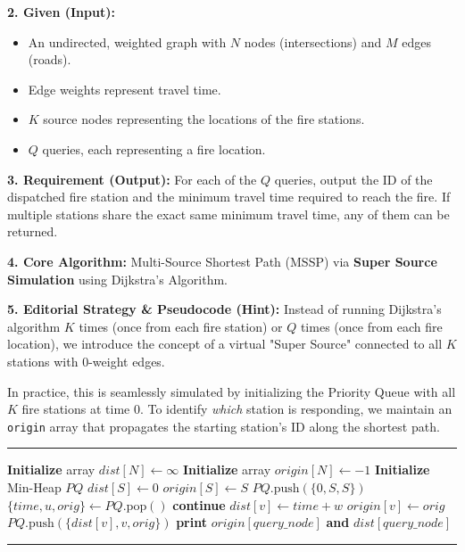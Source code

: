 \textbf{2. Given (Input):}
\begin{itemize}
    \item An undirected, weighted graph with $N$ nodes (intersections) and $M$ edges (roads).
    \item Edge weights represent travel time.
    \item $K$ source nodes representing the locations of the fire stations.
    \item $Q$ queries, each representing a fire location.
\end{itemize}

\textbf{3. Requirement (Output):}
For each of the $Q$ queries, output the ID of the dispatched fire station and the minimum travel time required to reach the fire. If multiple stations share the exact same minimum travel time, any of them can be returned.

\textbf{4. Core Algorithm:} 
Multi-Source Shortest Path (MSSP) via \textbf{Super Source Simulation} using Dijkstra's Algorithm.

\textbf{5. Editorial Strategy \& Pseudocode (Hint):}
Instead of running Dijkstra's algorithm $K$ times (once from each fire station) or $Q$ times (once from each fire location), we introduce the concept of a virtual "Super Source" connected to all $K$ stations with $0$-weight edges. 

In practice, this is seamlessly simulated by initializing the Priority Queue with all $K$ fire stations at time $0$. To identify \textit{which} station is responding, we maintain an \texttt{origin} array that propagates the starting station's ID along the shortest path.

\vspace{0.5em}
\noindent\rule{\textwidth}{0.6pt}
\begin{algorithmic}[1]
\State \textbf{Initialize} array $dist[N] \gets \infty$
\State \textbf{Initialize} array $origin[N] \gets -1$
\State \textbf{Initialize} Min-Heap $PQ$
\Statex
{}
    \State $dist[S] \gets 0$
    \State $origin[S] \gets S$
    \State $PQ.\text{push}(\{0, S, S\})$ 
\EndFor
\Statex
{}
    \State $\{time, u, orig\} \gets PQ.\text{pop}()$
        \State \textbf{continue} 
    \EndIf
    \Statex
            \State $dist[v] \gets time + w$
            \State $origin[v] \gets orig$ 
            \State $PQ.\text{push}(\{dist[v], v, orig\})$
        \EndIf
    \EndFor
\EndWhile
\Statex
{}
    \State \textbf{print} $origin[query\_node]$ \textbf{and} $dist[query\_node]$
\EndFor
\end{algorithmic}
\vspace{-0.5em}
\noindent\rule{\textwidth}{0.6pt}
\vspace{0.5em}

